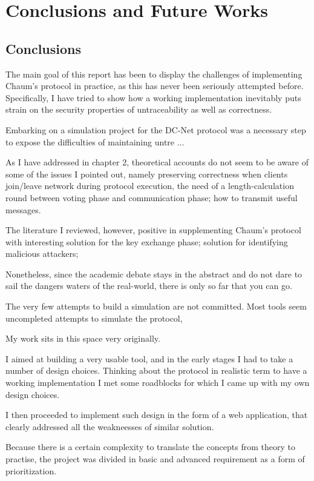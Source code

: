 \chapter{Conclusions and Future Works}

\section{Conclusions}

The main goal of this report has been to display the challenges of implementing Chaum's protocol in practice, as this has never been seriously attempted before. Specifically, I have tried to show how a working implementation inevitably puts strain on the security properties of untraceability as well as correctness. 

Embarking on a simulation project for the DC-Net protocol was a necessary step to expose the difficulties of maintaining untre ...

As I have addressed in chapter 2, theoretical accounts do not seem to be aware of some of the issues I pointed out, namely preserving correctness when clients join/leave network during protocol execution, the need of a length-calculation round between voting phase and communication phase; how to transmit useful messages. 
 
 The literature I reviewed, however, positive in supplementing Chaum's protocol with interesting solution for the key exchange phase; solution for identifying malicious attackers;
 
Nonetheless, since the academic debate stays in the abstract and do not dare to sail the dangers waters of the real-world, there is only so far that you can go. 


The very few attempts to build a simulation are not committed. Most tools seem uncompleted attempts to simulate the protocol, 


My work sits in this space very originally. 

I aimed at building a very usable tool, and in the early stages I had to take a number of design choices. Thinking about the protocol in realistic term to have a working implementation I met some roadblocks for which I came up with my own design choices. 

I then proceeded to implement such design in the form of a web application, that clearly addressed all the weakneesses of similar solution. 

Because there is a certain complexity to translate the concepts from theory to practise, the project was divided in basic and advanced requirement as a form of prioritization. 


